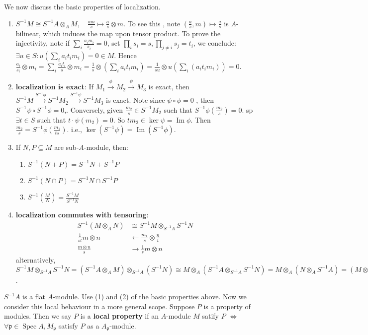\documentclass[12pt]{article}
\theoremstyle{definition}
\theoremstyle{plain}
\DeclareMathOperator{\im}{Im}
\DeclareMathOperator{\Spec}{Spec}
\begin{document}
\medskip
We now discuss the basic properties of localization.
\begin{enumerate}
  \item $S^{-1}M\cong S^{-1}A\otimes_A M, \quad \frac{am}{s} \mapsto \frac{a}{s}\otimes m$. To see this , note $(\frac{a}{s}, m) \mapsto \frac{a}{s}$ is $A$-bilinear, which induces the map upon tensor product. To prove the injectivity, note if $\sum_i\frac{a_im_i}{s_i}=0$, set $\prod_i s_i=s, \prod_{j\neq i} s_j=t_i$, we conclude: $\exists u\in S: u(\sum_ia_it_im_i)=0\in M$. Hence $\frac{a_i}{s_i} \otimes m_i=\sum_i \frac{a_it_i}{s}\otimes m_i=\frac{1}{s}\otimes (\sum_i a_it_im_i)=\frac{1}{su}\otimes u(\sum_i(a_it_im_i))=0$.
  \item \textbf{localization is exact}: If $M_1\overset{\phi}{\to} M_2\overset{\psi}{\to} M_3$ is exact, then $S^{-1}M\overset{S^{-1}\phi}{\to} S^{-1}M_2\overset{S^{-1}\psi}{\to} S^{-1}M_3$ is exact.  Note since $\psi\circ \phi=0$ , then $S^{-1}\psi\circ S^{-1}\phi=0$,. Conversely, given $\frac{m_2}{s}\in S^{-1}M_2$ such that $S^{-1}\phi(\frac{m_2}{s})=0$. sp $\exists t\in S$ such that $t\cdot \psi(m_2)=0$. So $tm_2\in \ker \psi=\im \phi$. Then $\frac{m_2}{s}=S^{-1}\phi(\frac{m_1}{ts})$. i.e., $\ker(S^{-1}\psi)=\im(S^{-1}\phi)$.
  \item If $N, P\subseteq M$ are sub-$A$-module, then:
  \begin{enumerate}
    \item $S^{-1}(N+P)=S^{-1}N+S^{-1}P$
    \item $S^{-1}(N\cap P)=S^{-1}N\cap S^{-1}P$
    \item $S^{-1}(\frac{M}{N})=\frac{S^{-1}M}{S^{-1}N}$
  \end{enumerate}
  \item \textbf{localization commutes with tensoring}:
  \begin{align*}
    S^{-1}(M\otimes_A N)&\cong S^{-1}M \otimes_{S^{-1}A} S^{-1}N\\
    \frac{1}{st}m\otimes n&\leftarrow \frac{m_1}{s}\otimes \frac{n}{t}\\
    \frac{m\otimes n}{s}&\rightarrow \frac{1}{s}m\otimes n
  \end{align*}
  alternatively, $S^{-1}M\otimes_{S^{-1}A} S^{-1}N=(S^{-1}A\otimes_A M)\otimes_{S^{-1}A}(S^{-1}N)\cong M\otimes_A (S^{-1}A\otimes_{S^{-1}A}S^{-1}N)=M\otimes_A(N\otimes_A S^{-1}A)=(M\otimes_A N)\otimes_A S^{-1}A=S^{-1}(M\otimes_A N)$.
\end{enumerate}
\Cor $S^{-1}A$ is a flat $A$-module.
\proof Use (1) and (2) of the basic properties above.
Now we consider this local behaviour in a more general scope.
\Def Suppose $P$ is  a property of modules. Then we say $P$ is a \textbf{local property} if an $A$-module $M$ satify $P$ $\iff$ $\forall \mathfrak{p}\in \Spec A, M_\mathfrak{p}$ satisfy $P$ as a $A_\mathfrak{p}$-module.
\end{document}
